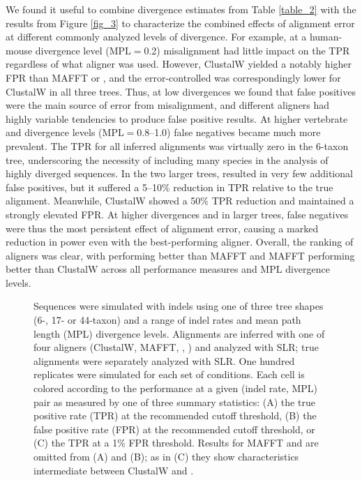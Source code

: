 \documentclass{article}
\begin{document}
We found it useful to combine divergence estimates from Table
\ref{table_2} with the results from Figure \ref{fig_3} to characterize
the combined effects of alignment error at different commonly analyzed
levels of divergence. For example, at a human-mouse divergence level
(MPL$=$0.2) misalignment had little impact on the TPR regardless of
what aligner was used. However, ClustalW yielded a notably higher FPR
than MAFFT or \prankc, and the error-controlled \tpr{} was
correspondingly lower for ClustalW in all three trees. Thus, at low
divergences we found that false positives were the main source of
error from misalignment, and different aligners had highly variable
tendencies to produce false positive results. At higher vertebrate and
\Dr divergence levels (MPL$=$0.8--1.0) false negatives became much
more prevalent. The TPR for all inferred alignments was virtually zero
in the 6-taxon tree, underscoring the necessity of including many
species in the analysis of highly diverged sequences. In the two
larger trees, \prankc resulted in very few additional false positives,
but it suffered a 5--10\% reduction in TPR relative to the true
alignment. Meanwhile, ClustalW showed a 50\% TPR reduction and
maintained a strongly elevated FPR. At higher divergences and in
larger trees, false negatives were thus the most persistent effect of
alignment error, causing a marked reduction in \sw power even with the
best-performing aligner. Overall, the ranking of aligners was clear,
with \prankc performing better than MAFFT and MAFFT performing better
than ClustalW across all performance measures and MPL divergence
levels.

\begin{figure*}[t]
\begin{center}
\end{center}
\caption{Sequences were simulated with indels using one of three tree
  shapes (6-, 17- or 44-taxon) and a range of indel rates and mean
  path length (MPL) divergence levels. Alignments are inferred with
  one of four aligners (ClustalW, MAFFT, \pranka{}, \prankc) and
  analyzed with SLR; true alignments were separately analyzed with
  SLR. One hundred replicates were simulated for each set of
  conditions. Each cell is colored according to the performance at a
  given (indel rate, MPL) pair as measured by one of three summary
  statistics: (A) the true positive rate (TPR) at the recommended
  cutoff threshold, (B) the false positive rate (FPR) at the
  recommended cutoff threshold, or (C) the TPR at a 1\% FPR
  threshold. Results for MAFFT and \pranka are omitted from (A) and
  (B); as in (C) they show characteristics intermediate between
  ClustalW and \prankc.}
\label{fig_4}
\end{figure*}
\end{document}

